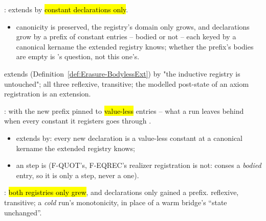 \begin{definition}
\label{def:Erasure-ConstExt}
\leanok
{}
 :  extends  by \hl{constant declarations
only}.
\begin{itemize}
\item canonicity is preserved, the registry's domain only grows, and declarations grow by a prefix
of constant entries -- bodied or not -- each keyed by a canonical kername the extended registry
knows; whether the prefix's bodies are empty is 's question, not this one's.
\end{itemize}
  extends  (Definition~\ref{def:Erasure-BodylessExt})
by "the inductive registry is untouched"; all three reflexive, transitive; the modelled post-state
of an axiom registration is an  extension.
\end{definition}

\begin{definition}
\label{def:Erasure-BodylessExt}
\leanok
{}
 :  with the new prefix pinned to \hl{value-less}
entries -- what a run leaves behind when every constant it registers goes through
.
\begin{itemize}
\item extends  by: every new declaration is a value-less constant at a canonical
kername the extended registry knows;
\item an  step is  (F-QUOT's, F-EQREC's realizer registration is
not:  conses a \emph{bodied} entry, so it is only a  step,
never a  one).
\end{itemize}
\end{definition}

\begin{definition}
\label{def:Erasure-StateLe}
\leanok
{}
 : \hl{both registries only grew}, and declarations only gained a
prefix.
 reflexive, transitive; a \emph{cold} run's monotonicity, in place of a warm bridge's
``state unchanged''.
\end{definition}

